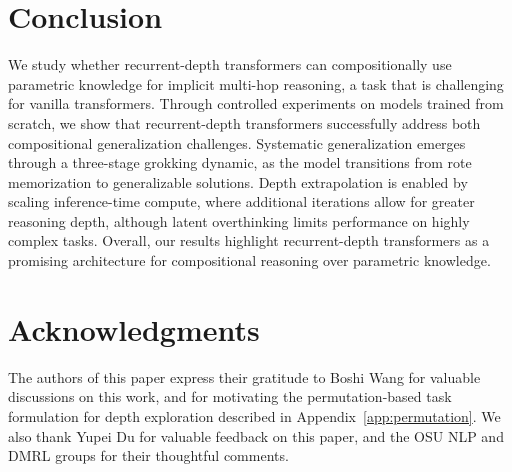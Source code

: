 \documentclass{article} %
\begin{document}


\section{Conclusion}
We study whether recurrent-depth transformers can compositionally use parametric knowledge for implicit multi-hop reasoning, a task that is challenging for vanilla transformers.
Through controlled experiments on models trained from scratch, we show that recurrent-depth transformers successfully address both compositional generalization challenges.
Systematic generalization emerges through a three-stage grokking dynamic, as the model transitions from rote memorization to generalizable solutions.
Depth extrapolation is enabled by scaling inference-time compute, where additional iterations allow for greater reasoning depth, although latent overthinking limits performance on highly complex tasks.
Overall, our results highlight recurrent-depth transformers as a promising architecture for compositional reasoning over parametric knowledge.

\section*{Acknowledgments}
The authors of this paper express their gratitude to Boshi Wang for valuable discussions on this work, and for motivating the permutation-based task formulation for depth exploration described in Appendix~\ref{app:permutation}. We also thank Yupei Du for valuable feedback on this paper, and the OSU NLP and DMRL groups for their thoughtful comments.
\end{document}

